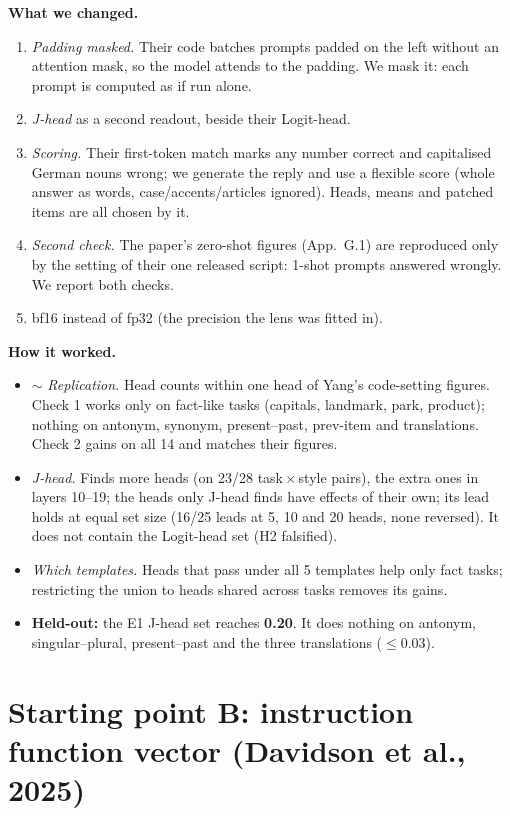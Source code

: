 \documentclass[10pt,a4paper]{article}
\newcommand{\yes}{\textcolor{green!45!black}{\ding{51}}}
\newcommand{\no}{\textcolor{red!70!black}{\ding{55}}}
\newcommand{\mixed}{\textcolor{orange!80!black}{$\sim$}}
\begin{document}
\textbf{What we changed.}
\begin{enumerate}
\item \emph{Padding masked.} Their code batches prompts padded on the left without an attention mask, so the model attends to the padding. We mask it: each prompt is computed as if run alone.
\item \emph{J-head} as a second readout, beside their Logit-head.
\item \emph{Scoring.} Their first-token match marks any number correct and capitalised German nouns wrong; we generate the reply and use a flexible score (whole answer as words, case/accents/articles ignored). Heads, means and patched items are all chosen by it.
\item \emph{Second check.} The paper's zero-shot figures (App.~G.1) are reproduced only by the setting of their one released script: 1-shot prompts answered wrongly. We report both checks.
\item bf16 instead of fp32 (the precision the lens was fitted in).
\end{enumerate}

\textbf{How it worked.}
\begin{itemize}
\item \mixed{} \emph{Replication.} Head counts within one head of Yang's code-setting figures. Check 1 works only on fact-like tasks (capitals, landmark, park, product); nothing on antonym, synonym, present--past, prev-item and translations. Check 2 gains on all 14 and matches their figures.
\item \yes{} \emph{J-head.} Finds more heads (on 23/28 task\,$\times$\,style pairs), the extra ones in layers 10--19; the heads only J-head finds have effects of their own; its lead holds at equal set size (16/25 leads at 5, 10 and 20 heads, none reversed). It does not contain the Logit-head set (H2 falsified).
\item \no{} \emph{Which templates.} Heads that pass under all 5 templates help only fact tasks; restricting the union to heads shared across tasks removes its gains.
\item \textbf{Held-out:} the E1 J-head set reaches \textbf{0.20}. It does nothing on antonym, singular--plural, present--past and the three translations ($\leq$0.03).
\end{itemize}

\section{Starting point B: instruction function vector (Davidson et al., 2025)}
\end{document}
